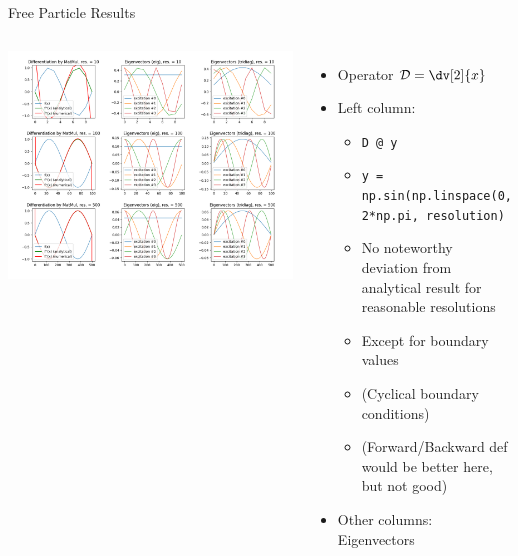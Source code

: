 \begin{frame}{Free Particle Results}
%
\begin{columns}[T]
\includegraphics[width=\linewidth]{./gfx/04-free-particle-resolutions}
%
\begin{itemize}
\item Operator $\mathcal{D} = \dv[2]{x}$
\item Left column: 
	\begin{itemize}
	\item \texttt{D @ y} 
	\item \texttt{y = np.sin(np.linspace(0, 2*np.pi, resolution)}
	\item No noteworthy deviation from analytical result for reasonable resolutions
	\item Except for boundary values
	\item (Cyclical boundary conditions)
	\item (Forward/Backward def would be better here, but not good)
	\end{itemize}
\item Other columns: Eigenvectors
\end{itemize}
\end{columns}
%
\end{frame}


